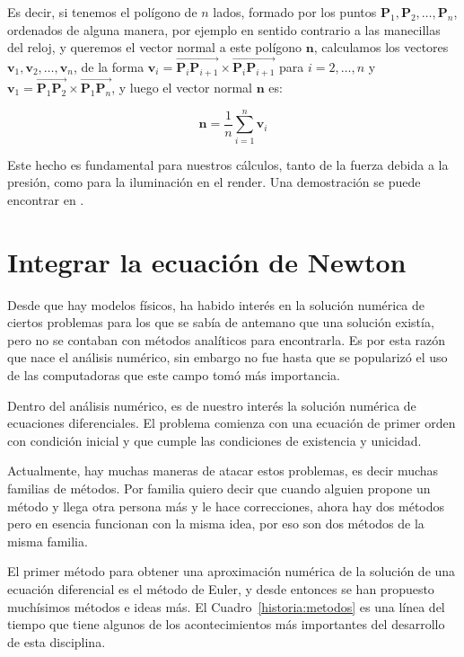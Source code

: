 Es decir, si tenemos el polígono de $n$ lados, formado por los puntos $\textbf{P}_1, \textbf{P}_2, \ldots, \textbf{P}_n$, ordenados de alguna manera, por ejemplo en sentido contrario a las manecillas del reloj, y queremos el vector normal a este polígono $\textbf{n}$, calculamos los vectores $ \textbf{v}_1, \textbf{v}_2, \ldots , \textbf{v}_n $, de la forma $\textbf{v}_i = \overrightarrow{\textbf{P}_i \textbf{P}_{i + 1}} \times \overrightarrow{\textbf{P}_i \textbf{P}_{i + 1}} $ para $i = 2, \ldots, n$ y $\textbf{v}_1 = \overrightarrow{\textbf{P}_1 \textbf{P}_2} \times \overrightarrow{\textbf{P}_1 \textbf{P}_n}$, y luego el vector normal $\textbf{n}$ es:

\begin{equation}
\label{formulaVecNormal} 
\textbf{n} = \frac{1}{n} \sum_{i=1}^{n} \textbf{v}_i
\end{equation}

Este hecho es fundamental para nuestros cálculos, tanto de la fuerza debida a la presión, como para la iluminación en el render.
Una demostración se puede encontrar en \cite{GeometriaParaCAD}.

\section{Integrar la ecuación de Newton}
Desde que hay modelos físicos, ha habido interés en la solución numérica de ciertos problemas para los que se sabía de antemano que una solución existía, pero no se contaban con métodos analíticos para encontrarla.
Es por esta razón que nace el análisis numérico, sin embargo no fue hasta que se popularizó el uso de las computadoras que este campo tomó más importancia.

Dentro del análisis numérico, es de nuestro interés la solución numérica de ecuaciones diferenciales.
El problema comienza con una ecuación de primer orden con condición inicial y que cumple las condiciones de existencia y unicidad.

Actualmente, hay muchas maneras de atacar estos problemas, es decir muchas familias de métodos.
Por familia quiero decir que cuando alguien propone un método y llega otra persona más y le hace correcciones, ahora hay dos métodos pero en esencia funcionan con la misma idea, por eso son dos métodos de la misma familia.

El primer método para obtener una aproximación numérica de la solución de una ecuación diferencial es el método de Euler, y desde entonces se han propuesto muchísimos métodos e ideas más.
El Cuadro~\ref{historia:metodos} es una línea del tiempo que tiene algunos de los acontecimientos más importantes del desarrollo de esta disciplina.

